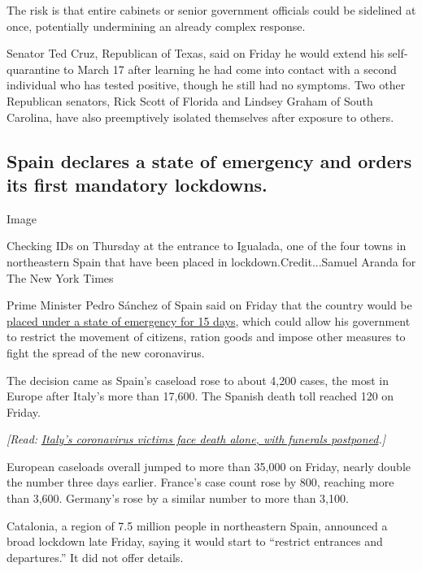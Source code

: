 The risk is that entire cabinets or senior government officials could be
sidelined at once, potentially undermining an already complex response.

Senator Ted Cruz, Republican of Texas, said on Friday he would extend
his self-quarantine to March 17 after learning he had come into contact
with a second individual who has tested positive, though he still had no
symptoms. Two other Republican senators, Rick Scott of Florida and
Lindsey Graham of South Carolina, have also preemptively isolated
themselves after exposure to others.

\hypertarget{spain-declares-a-state-of-emergency-and-orders-its-first-mandatory-lockdowns}{%
\subsection{Spain declares a state of emergency and orders its first
mandatory
lockdowns.}\label{spain-declares-a-state-of-emergency-and-orders-its-first-mandatory-lockdowns}}

Image

Checking IDs on Thursday at the entrance to Igualada, one of the four
towns in northeastern Spain that have been placed in
lockdown.Credit...Samuel Aranda for The New York Times

Prime Minister Pedro Sánchez of Spain said on Friday that the country
would be
\href{https://www.nytimes3xbfgragh.onion/2020/03/13/world/europe/spain-coronavirus-emergency.html}{placed
under a state of emergency for 15 days}, which could allow his
government to restrict the movement of citizens, ration goods and impose
other measures to fight the spread of the new coronavirus.

The decision came as Spain's caseload rose to about 4,200 cases, the
most in Europe after Italy's more than 17,600. The Spanish death toll
reached 120 on Friday.

\emph{{[}Read:}
\href{http://www.nytimes3xbfgragh.onion/2020/03/16/world/europe/italy-coronavirus-funerals.html}{\emph{Italy's
coronavirus victims face death alone, with funerals
postponed}}\emph{.{]}}

European caseloads overall jumped to more than 35,000 on Friday, nearly
double the number three days earlier. France's case count rose by 800,
reaching more than 3,600. Germany's rose by a similar number to more
than 3,100.

Catalonia, a region of 7.5 million people in northeastern Spain,
announced a broad lockdown late Friday, saying it would start to
``restrict entrances and departures.'' It did not offer details.

